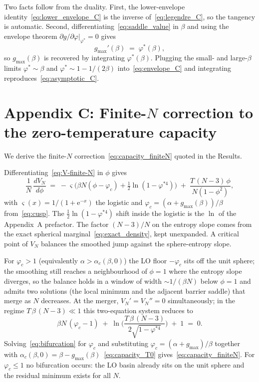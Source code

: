 \documentclass[letterpaper]{article} %
\newcommand{\e}{{\mathrm{e}}}
\newcommand{\Bnet}{\beta}
\newcommand{\gmax}{g_{\max}}
\newcommand{\ac}{\alpha_c}
\newcommand{\p}{\partial}
\begin{document}
Two facts follow from the duality.  First, the lower-envelope
identity~\eqref{eq:lower_envelope_C} is the inverse
of~\eqref{eq:legendre_C}, so the tangency is automatic.  Second,
differentiating~\eqref{eq:saddle_value} in $\Bnet$ and using the
envelope theorem $\p g/\p\varphi|_{\varphi^*} = 0$ gives
\begin{equation}
g_{\max}'(\Bnet) \;=\; \varphi^*(\Bnet),
\label{eq:envelope_C}
\end{equation}
so $g_{\max}(\Bnet)$ is recovered by integrating $\varphi^*(\Bnet)$.
Plugging the small- and large-$\Bnet$ limits $\varphi^* \sim \Bnet$
and $\varphi^* \sim 1 - 1/(2\Bnet)$ into~\eqref{eq:envelope_C} and
integrating reproduces~\eqref{eq:asymptotic_C}.


\section{Appendix C: Finite-$N$ correction to the zero-temperature capacity}
\label{sec:appendix_C}

We derive the finite-$N$ correction~\eqref{eq:capacity_finiteN}
quoted in the Results.

Differentiating~\eqref{eq:V-finite-N} in $\phi$ gives
\begin{equation}
\frac{1}{N}\,\frac{dV_N}{d\phi}
   \;=\; -\varsigma\!\Big(\Bnet N(\phi - \varphi_c)
                       + \tfrac{1}{2}\ln(1-\varphi^{*4})\Big)
   \;+\; \frac{T\,(N-3)\,\phi}{N(1-\phi^{2})},
\label{eq:V-finite-N-deriv}
\end{equation}
with $\varsigma(x) = 1/(1 + \e^{-x})$ the logistic and
$\varphi_c = (\alpha + \gmax(\Bnet))/\Bnet$ from~\eqref{eq:cusp}.
The $\tfrac{1}{2}\ln(1-\varphi^{*4})$ shift inside the logistic is
the $\ln$ of the Appendix~A prefactor.  The factor $(N-3)/N$ on the
entropy slope comes from the exact spherical
marginal~\eqref{eq:exact_density}, kept unexpanded.  A critical point
of $V_N$ balances the smoothed jump against the sphere-entropy slope.

For $\varphi_c > 1$ (equivalently $\alpha > \ac(\Bnet, 0)$) the LO
floor $-\varphi_c$ sits off the unit sphere; the smoothing still
reaches a neighbourhood of $\phi = 1$ where the entropy slope
diverges, so the balance holds in a window of width
$\sim 1/(\Bnet N)$ below $\phi = 1$ and admits two solutions (the
local minimum and the adjacent barrier saddle) that merge as $N$
decreases.  At the merger, $V_N' = V_N'' = 0$ simultaneously; in
the regime $T\,\Bnet\,(N-3) \ll 1$ this two-equation system reduces
to
\begin{equation}
\Bnet N\,(\varphi_c - 1) \;+\;
   \ln\!\Bigg(\frac{T\,\Bnet\,(N-3)}{2\sqrt{1-\varphi^{*4}}}\Bigg) \;+\; 1
\;=\; 0.
\label{eq:bifurcation}
\end{equation}
Solving~\eqref{eq:bifurcation} for $\varphi_c$ and substituting
$\varphi_c = (\alpha + \gmax)/\Bnet$ together with
$\ac(\Bnet, 0) = \Bnet - \gmax(\Bnet)$~\eqref{eq:capacity_T0}
gives~\eqref{eq:capacity_finiteN}.  For $\varphi_c \le 1$ no
bifurcation occurs: the LO basin already sits on the unit sphere
and the residual minimum exists for all $N$.
\end{document}
